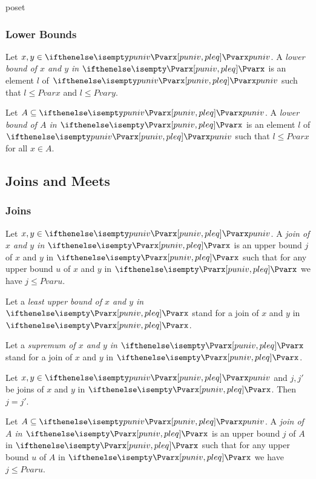 \documentclass{stex}
\begin{document}
\begin{smodule}{poset}
  \subsubsection{Lower Bounds}

  \begin{forthel}    
    \begin{definition}
      Let $x, y \in \univ{Pvar}$.
      A \emph{lower bound of $x$ and $y$ in $\Pvar{}$} is an element $l$ of $\univ{Pvar}$ such that $l \leq{Pvar} x$ and $l \leq{Pvar} y$.
    \end{definition}
    
    \begin{definition}
      Let $A \subseteq \univ{Pvar}$.
      A \emph{lower bound of $A$ in $\Pvar{}$} is an element $l$ of $\univ{Pvar}$ such that $l \leq{Pvar} x$ for all $x \in A$.
    \end{definition}
  \end{forthel}

  \subsection{Joins and Meets}

  \subsubsection{Joins}

  \begin{forthel}
    \begin{definition}
      Let $x, y \in \univ{Pvar}$.
      A \emph{join of $x$ and $y$ in $\Pvar{}$} is an upper bound $j$ of $x$ and $y$ in $\Pvar{}$ such that for any upper bound $u$ of $x$ and $y$ in $\Pvar{}$ we have $j \leq{Pvar} u$.
    \end{definition}

    Let a \emph{least upper bound of $x$ and $y$ in $\Pvar{}$} stand for a join of $x$ and $y$ in $\Pvar{}$.

    Let a \emph{supremum of $x$ and $y$ in $\Pvar{}$} stand for a join of $x$ and $y$ in $\Pvar{}$.

    \begin{proposition}
      Let $x, y \in \univ{Pvar}$ and $j, j'$ be joins of $x$ and $y$ in $\Pvar{}$.
      Then $j = j'$.
    \end{proposition}
    
    \begin{definition}
      Let $A \subseteq \univ{Pvar}$.
      A \emph{join of $A$ in $\Pvar{}$} is an upper bound $j$ of $A$ in $\Pvar{}$ such that for any upper bound $u$ of $A$ in $\Pvar{}$ we have $j \leq{Pvar} u$.
    \end{definition}


\end{forthel}
\end{smodule}
\end{document}
